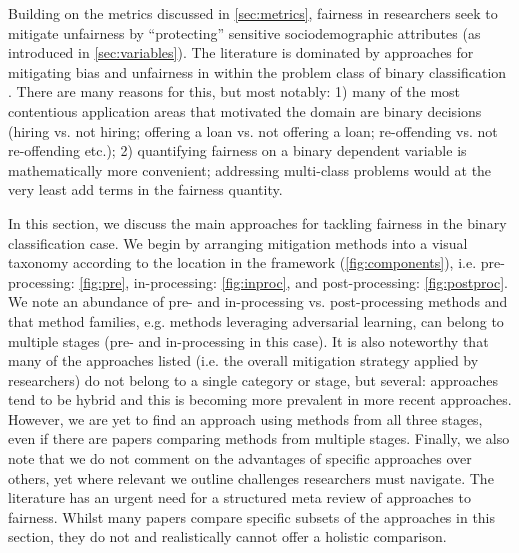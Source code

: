 \label{sec:approaches}
Building on the metrics discussed in \autoref{sec:metrics}, fairness in \ml researchers seek to mitigate unfairness by ``protecting'' sensitive sociodemographic attributes (as introduced in \autoref{sec:variables}). The literature is dominated by approaches for mitigating bias and unfairness in \ml within the problem class of binary classification . There are many reasons for this, but most notably: 1) many of the most contentious application areas that motivated the domain are binary decisions (hiring vs. not hiring; offering a loan vs. not offering a loan; re-offending vs. not re-offending etc.); 2) quantifying fairness on a binary dependent variable is mathematically more convenient; addressing multi-class problems would at the very least add terms in the fairness quantity. 

In this section, we discuss the main approaches for tackling fairness in the binary classification case. We begin by arranging mitigation methods into a visual taxonomy according to the location in the \ml framework (\autoref{fig:components}), i.e. pre-processing: \autoref{fig:pre}, in-processing: \autoref{fig:inproc}, and post-processing: \autoref{fig:postproc}. We note an abundance of pre- and in-processing vs. post-processing methods and that method families, e.g. methods leveraging adversarial learning, can belong to multiple stages (pre- and in-processing in this case). It is also noteworthy that many of the approaches listed (i.e. the overall mitigation strategy applied by researchers) do not belong to a single category or stage, but several: approaches tend to be hybrid and this is becoming more prevalent in more recent approaches. However, we are yet to find an approach using methods from all three stages, even if there are papers comparing methods from multiple stages. Finally, we also note that we do not comment on the advantages of specific approaches over others, yet where relevant we outline challenges researchers must navigate. The literature has an urgent need for a structured meta review of approaches to fairness. Whilst many papers compare specific subsets of the approaches in this section, they do not and realistically cannot offer a holistic comparison. 












